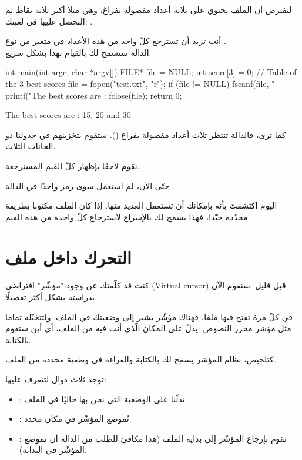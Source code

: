 لنفترض أن الملف يحتوي على ثلاثة أعداد مفصولة بفراغ، وهي مثلا أكبر ثلاثة نقاط تم التحصل عليها في لعبتك:
.

أنت تريد أن تسترجع كلّ واحد من هذه الأعداد في متغير من نوع
.\\
الدالة
ستسمح لك بالقيام بهذا بشكل سريع.

\begin{Csource}
int main(int argc, char *argv[])
{
  FILE* file = NULL;
  int score[3] = {0}; // Table of the 3 best scores
  file = fopen("test.txt", "r");
  if (file != NULL)
  {
    fscanf(file, "%
    printf("The best scores are : %
    fclose(file);
  }
  return 0;
}
\end{Csource}

\begin{Console}
The best scores are : 15, 20 and 30
\end{Console}

كما ترى، فالدالة
تنتظر ثلاث أعداد مفصولة بفراغ
().
ستقوم بتخزينهم في جدولنا ذو الخانات الثلاث.

نقوم لاحقًا بإظهار كلّ القيم المسترجعة.

\begin{information}
حتّى الآن، لم استعمل سوى رمز
واحدًا في الدالة
.

اليوم اكتشفتَ بأنه بإمكانك أن تستعمل العديد منها. إذا كان الملف مكتوبا بطريقة محدّدة جيّدا، فهذا يسمح لك بالإسراع لاسترجاع كلّ واحدة من هذه القيم.
\end{information}

\section{التحرك داخل ملف}

كنت قد كلّمتك عن وجود "مؤشّر" افتراضي
(\textenglish{Virtual cursor})
قبل قليل.
سنقوم الآن بدراسته بشكل أكثر تفصيلًا.

في كلّ مرة تفتح فيها ملفا، فهناك مؤشّر يشير إلى وضعيتك في الملف. ولتتخيّله تماما مثل مؤشر محرر النصوص. يدلّ على المكان الّذي أنت فيه من الملف، أي أين ستقوم بالكتابة.

كتلخيص، نظام المؤشر يسمح لك بالكتابة والقراءة في وضعية محددة من الملف.

توجد ثلاث دوال لتتعرف عليها:

\begin{itemize}
  \item {}:
  تدلّنا على الوضعية التي نحن بها حاليًا في الملف.
  \item {}:
  تُموضع المؤشّر في مكان محدد.
  \item {}:
  تقوم بإرجاع المؤشّر إلى بداية الملف (هذا مكافئ للطلب من الدالة
  أن تموضع المؤشّر في البداية).
\end{itemize}

